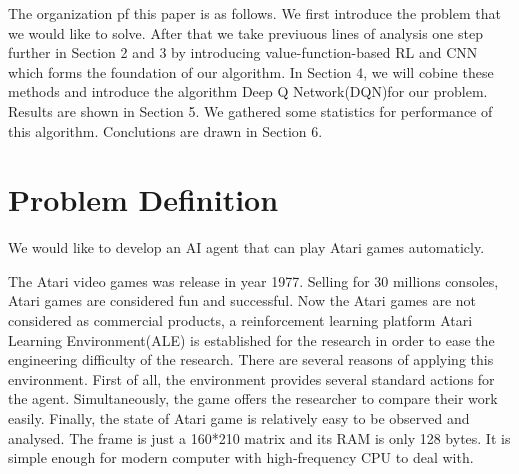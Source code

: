 \documentclass{article}
\begin{document}
The organization pf this paper is as follows. We first introduce the problem that we would like to solve. After that we take previuous lines of analysis one step further in Section 2 and 3 by introducing value-function-based RL and CNN which forms the foundation of our algorithm. In Section 4, we will cobine these methods and introduce the algorithm Deep Q Network(DQN)for our problem. Results are shown in Section 5. We gathered some statistics for performance of this algorithm. Conclutions are drawn in Section 6. 

\section{Problem Definition}
We would like to develop an AI agent that can play Atari games automaticly.

The Atari video games was release in year 1977. Selling for 30 millions consoles, Atari games are considered fun and successful. Now the Atari games are not considered as commercial products, a reinforcement learning platform Atari Learning Environment(ALE) is established for the research in order to ease the engineering difficulty of the research\cite{bellemare12arcade}. There are several reasons of applying this environment. First of all, the environment provides several standard actions for the agent. Simultaneously, the game offers the researcher to compare their work easily. Finally, the state of Atari game is relatively easy to be observed and analysed. The frame is just a 160*210 matrix and its RAM is only 128 bytes. It is simple enough for modern computer with high-frequency CPU to deal with.
\end{document}
